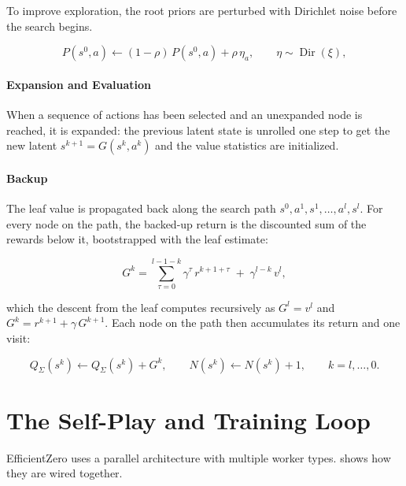 To improve exploration, the root priors are perturbed with Dirichlet noise
before the search begins.

\begin{equation}\label{eq:ez-dirichlet}
  P(s^0,a) \leftarrow (1-\rho)\,P(s^0,a)+\rho\,\eta_a,
  \qquad \eta\sim\operatorname{Dir}(\xi),
\end{equation}

\paragraph{Expansion and Evaluation}\label{sec:ez-mcts-expansion}

When a sequence of actions has been selected and an unexpanded node is reached,
it is expanded: the previous latent state is unrolled one step to get the new
latent $s^{k+1}=G(s^k,a^k)$ and the value statistics are initialized.

\paragraph{Backup}\label{sec:ez-mcts-backup}

The leaf value is propagated back along the search path
$s^0, a^1, s^1, \dots, a^l, s^l$.
For every node on the path, the backed-up return is the discounted sum of the
rewards below it, bootstrapped with the leaf estimate:

\begin{equation}\label{eq:ez-backup}
  G^k=\sum_{\tau=0}^{l-1-k}\gamma^{\tau}\,r^{k+1+\tau}\;+\;\gamma^{l-k}\,v^l,
\end{equation}

which the descent from the leaf computes recursively as $G^l=v^l$ and
$G^k=r^{k+1}+\gamma\,G^{k+1}$.
Each node on the path then accumulates its return and one visit:

\begin{equation}\label{eq:ez-backup-update}
  Q_\Sigma(s^k) \leftarrow Q_\Sigma(s^k)+G^k,
  \qquad
  N(s^k) \leftarrow N(s^k)+1,
  \qquad k=l,\dots,0.
\end{equation}

\section{The Self-Play and Training Loop}\label{sec:ez-loop}

EfficientZero uses a parallel architecture with multiple worker types.
 shows how they are wired together.

